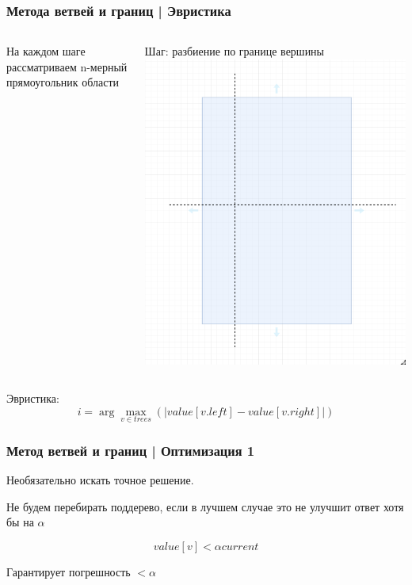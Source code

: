 \documentclass{beamer}
\begin{document}
\begin{frame} \frametitle{Метода ветвей и границ | Эвристика}

    \begin{columns}
            На каждом шаге рассматриваем n-мерный прямоугольник области

            Шаг: разбиение по границе вершины
            \includegraphics[width=\textwidth]{split.png}
    \end{columns}
    \vfill
    \pause{}
    Эвристика:
    \[
        i = \arg \max_{v \in trees}(|value[v.left] - value[v.right]|)
    \]
\end{frame}

\begin{frame} \frametitle{Метод ветвей и границ | Оптимизация 1}
    Необязательно искать точное решение.

    \vspace{50px}
    Не будем перебирать поддерево, если в лучшем случае это не улучшит ответ хотя бы на $\alpha$

    \[
        value[v] < \alpha current
    \]

    Гарантирует погрешность $<\alpha$
\end{frame}
\end{document}
